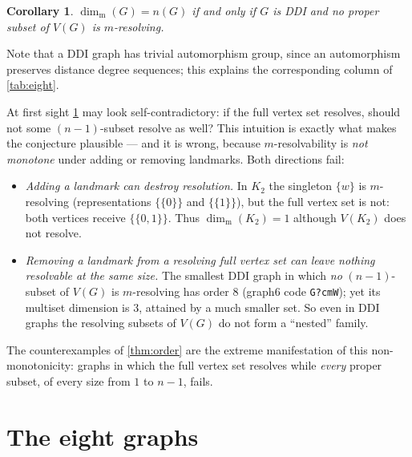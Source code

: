 \documentclass[11pt]{amsart}
\newtheorem{corollary}[corollary]{Corollary}
\theoremstyle{remark}
\newcommand{\mdim}{\operatorname{dim}_{\mathrm m}}
\newcommand{\ms}[1]{\mathopen{\{\!\{}#1\mathclose{\}\!\}}}
\begin{document}
\begin{corollary}\label{cor:char}
$\mdim(G)=n(G)$ if and only if $G$ is DDI and no proper subset of $V(G)$ is $m$-resolving.
\end{corollary}

Note that a DDI graph has trivial automorphism group, since an automorphism preserves distance degree sequences; this explains the corresponding column of \cref{tab:eight}.

At first sight \cref{cor:char} may look self-contradictory: if the full vertex set resolves, should not some $(n-1)$-subset resolve as well?  This intuition is exactly what makes the conjecture plausible --- and it is wrong, because $m$-resolvability is \emph{not monotone} under adding or removing landmarks.  Both directions fail:

\begin{itemize}[leftmargin=2em]
\item \emph{Adding a landmark can destroy resolution.}  In $K_2$ the singleton $\{w\}$ is $m$-resolving (representations $\ms{0}$ and $\ms{1}$), but the full vertex set is not: both vertices receive $\ms{0,1}$.  Thus $\mdim(K_2)=1$ although $V(K_2)$ does not resolve.
\item \emph{Removing a landmark from a resolving full vertex set can leave nothing resolvable at the same size.}  The smallest DDI graph in which \emph{no} $(n-1)$-subset of $V(G)$ is $m$-resolving has order $8$ (graph6 code \texttt{G?\kern0pt\textasciigrave cmW}); yet its multiset dimension is $3$, attained by a much smaller set.  So even in DDI graphs the resolving subsets of $V(G)$ do not form a ``nested'' family.
\end{itemize}

The counterexamples of \cref{thm:order} are the extreme manifestation of this non-monotonicity: graphs in which the full vertex set resolves while \emph{every} proper subset, of every size from $1$ to $n-1$, fails.

\section{The eight graphs}\label{sec:graphs}
\end{document}
